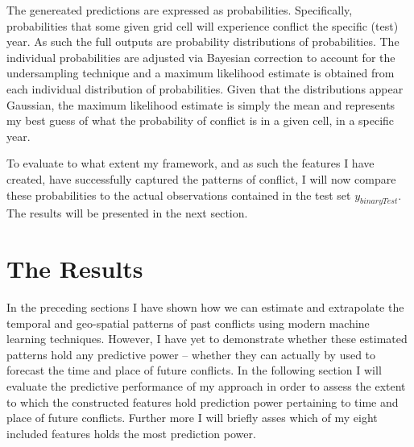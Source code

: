 \documentclass[a4paper]{article}
\begin{document}


The genereated predictions are expressed as probabilities. Specifically, probabilities that some given grid cell will experience conflict the specific (test) year. As such the full outputs are probability distributions of probabilities. The individual probabilities are adjusted via Bayesian correction to account for the undersampling technique and a maximum likelihood estimate is obtained from each individual distribution of probabilities. Given that the distributions appear Gaussian, the maximum likelihood estimate is simply the mean and represents my best guess of what the probability of conflict is in a given cell, in a specific year.\par 


To evaluate to what extent my framework, and as such the features I have created, have successfully captured the patterns of conflict, I will now compare these probabilities to the actual observations contained in the test set $y_{binaryTest}$. The results will be presented in the next section.\par

\section{The Results}

In the preceding sections I have shown how we can estimate and extrapolate the temporal and geo-spatial patterns of past conflicts using modern machine learning techniques. However, I have yet to demonstrate whether these estimated patterns hold any predictive power -- whether they can actually by used to forecast the time and place of future conflicts. In the following section I will evaluate the predictive performance of my approach in order to assess the extent to which the constructed features hold prediction power pertaining to time and place of future conflicts. Further more I will briefly asses which of my eight included features holds the most prediction power.\par 
\end{document}
